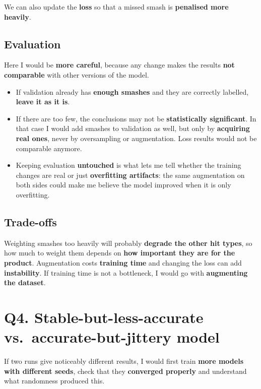 \documentclass[11pt,a4paper]{article}
\begin{document}
We can also update the \textbf{loss} so that a missed smash is \textbf{penalised more
heavily}.

\subsection*{Evaluation}

Here I would be \textbf{more careful}, because any change makes the results \textbf{not
comparable} with other versions of the model.

\begin{itemize}
  \item If validation already has \textbf{enough smashes} and they are correctly labelled,
    \textbf{leave it as it is}.
  \item If there are too few, the conclusions may not be \textbf{statistically significant}.
    In that case I would add smashes to validation as well, but only by \textbf{acquiring real
    ones},
    never by oversampling or augmentation. Loss results would not be comparable anymore.
  \item Keeping evaluation \textbf{untouched} is what lets me tell whether the training
    changes are real or just \textbf{overfitting artifacts}: the same augmentation on both
    sides could make me believe the model improved when it is only overfitting.
\end{itemize}

\subsection*{Trade-offs}

Weighting smashes too heavily will probably \textbf{degrade the other hit types}, so how much
to weight them depends on \textbf{how important they are for the product}. Augmentation costs
\textbf{training time} and changing the loss can add \textbf{instability}. If training time is
not a bottleneck, I would go with \textbf{augmenting the dataset}.

\section*{Q4. Stable-but-less-accurate vs.\ accurate-but-jittery model}

If two runs give noticeably different results, I would first train \textbf{more models with
different seeds}, check that they \textbf{converged properly} and understand what randomness
produced this.
\end{document}
